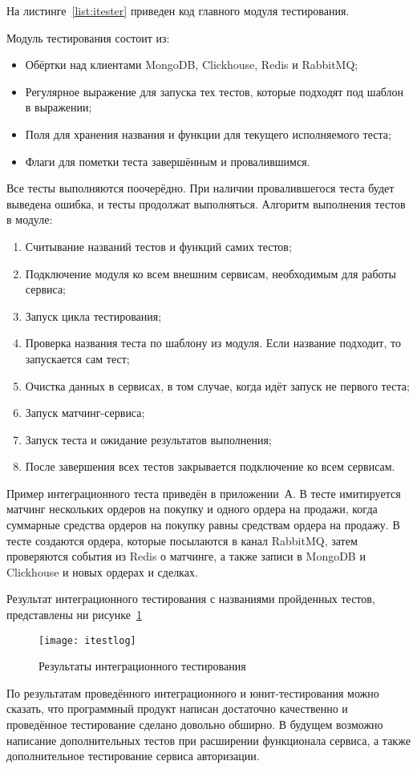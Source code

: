 На листинге~\ref{list:itester} приведен код главного модуля тестирования.



Модуль тестирования состоит из:
\begin{itemize}
    \item Обёртки над клиентами MongoDB, Clickhouse, Redis и RabbitMQ;
    \item Регулярное выражение для запуска тех тестов, которые подходят под шаблон в выражении;
    \item Поля для хранения названия и функции для текущего исполняемого теста;
    \item Флаги для пометки теста завершённым и провалившимся.
\end{itemize}

Все тесты выполняются поочерёдно. При наличии провалившегося теста будет выведена ошибка, и тесты продолжат выполняться. Алгоритм выполнения тестов в модуле:

\begin{enumerate}
    \item Считывание названий тестов и функций самих тестов;
    \item Подключение модуля ко всем внешним сервисам, необходимым для работы сервиса;
    \item Запуск цикла тестирования;
    \item Проверка названия теста по шаблону из модуля. Если название подходит, то запускается сам тест;
    \item Очистка данных в сервисах, в том случае, когда идёт запуск не первого теста;
    \item Запуск матчинг-сервиса;
    \item Запуск теста и ожидание результатов выполнения;
    \item После завершения всех тестов закрывается подключение ко всем сервисам.
\end{enumerate}

Пример интеграционного теста приведён в приложении~А. В тесте имитируется матчинг нескольких ордеров на покупку и одного ордера на продажи, когда суммарные средства ордеров на покупку равны средствам ордера на продажу. В тесте создаются ордера, которые посылаются в канал RabbitMQ, затем проверяются события из Redis о матчинге, а также записи в MongoDB и Clickhouse и новых ордерах и сделках.

Результат интеграционного тестирования с названиями пройденных тестов, представлены ни рисунке~\ref{fig:itestlog}

\begin{figure}[ht]
    \centering
    \texttt{[image: itestlog]}
    \caption{Результаты интеграционного тестирования}\label{fig:itestlog}
\end{figure}

По результатам проведённого интеграционного и юнит-тестирования можно сказать, что программный продукт написан достаточно качественно и проведённое тестирование сделано довольно обширно. В будущем возможно написание дополнительных тестов при расширении функционала сервиса, а также дополнительное тестирование сервиса авторизации.
